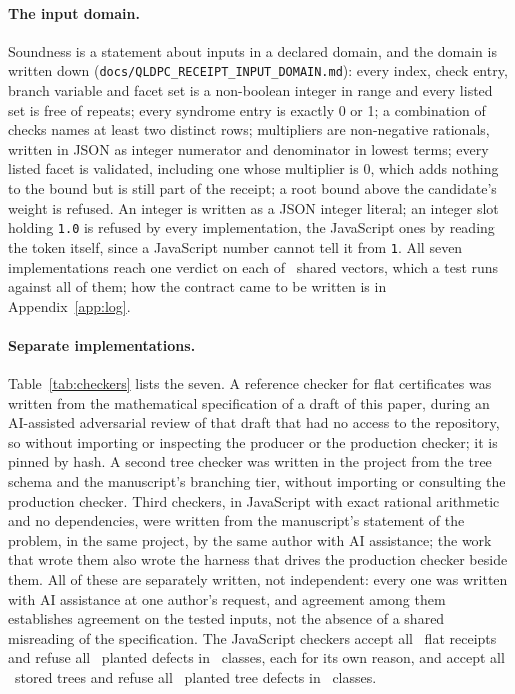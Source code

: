 \documentclass[aps,pra,twocolumn,superscriptaddress,nofootinbib,longbibliography,floatfix]{revtex4-2}
\begin{document}
\paragraph*{The input domain.} Soundness is a statement about inputs in a declared domain, and the domain is written down (\nolinkurl{docs/QLDPC_RECEIPT_INPUT_DOMAIN.md}): every index, check entry, branch variable and facet set is a non-boolean integer in range and every listed set is free of repeats; every syndrome entry is exactly 0 or 1; a combination of checks names at least two distinct rows; multipliers are non-negative rationals, written in JSON as integer numerator and denominator in lowest terms; every listed facet is validated, including one whose multiplier is 0, which adds nothing to the bound but is still part of the receipt; a root bound above the candidate's weight is refused. An integer is written as a JSON integer literal; an integer slot holding \texttt{1.0} is refused by every implementation, the JavaScript ones by reading the token itself, since a JavaScript number cannot tell it from \texttt{1}. All seven implementations reach one verdict on each of \DomainVectors\ shared vectors, which a test runs against all of them; how the contract came to be written is in Appendix~\ref{app:log}.

\paragraph*{Separate implementations.} Table~\ref{tab:checkers} lists the seven. A reference checker for flat certificates was written from the mathematical specification of a draft of this paper, during an AI-assisted adversarial review of that draft that had no access to the repository, so without importing or inspecting the producer or the production checker; it is pinned by hash. A second tree checker was written in the project from the tree schema and the manuscript's branching tier, without importing or consulting the production checker. Third checkers, in JavaScript with exact rational arithmetic and no dependencies, were written from the manuscript's statement of the problem, in the same project, by the same author with AI assistance; the work that wrote them also wrote the harness that drives the production checker beside them. All of these are separately written, not independent: every one was written with AI assistance at one author's request, and agreement among them establishes agreement on the tested inputs, not the absence of a shared misreading of the specification. The JavaScript checkers accept all \JsFlatAccepted\ flat receipts and refuse all \JsDefects\ planted defects in \JsDefectClasses\ classes, each for its own reason, and accept all \JsTreeAccepted\ stored trees and refuse all \JsTreeDefects\ planted tree defects in \JsTreeDefectClasses\ classes.
\end{document}
